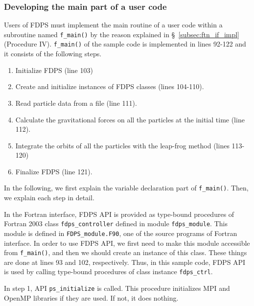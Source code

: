 \documentclass[twocolumn,useamsfonts]{pasj01}
\begin{document}
\subsubsection{Developing the main part of a user code}
Users of FDPS must implement the main routine of a user code within a subroutine named \texttt{f\_main()} by the reason explained in \S~\ref{subsec:ftn_if_impl} (Procedure IV). \texttt{f\_main()} of the sample code is implemented in lines 92-122 and it consists of the following steps.
\begin{enumerate}
\item Initialize FDPS (line 103)
\item Create and initialize instances of FDPS classes (lines 104-110).
\item Read particle data from a file (line 111).
\item Calculate the gravitational forces on all the particles at the initial time (line 112).
\item Integrate the orbits of all the particles with the leap-frog method (lines 113-120)
\item Finalize FDPS (line 121).
\end{enumerate}
In the following, we first explain the variable declaration part of \texttt{f\_main()}. Then, we explain each step in detail.

In the Fortran interface, FDPS API is provided as type-bound procedures of  Fortran 2003 class \texttt{fdps\_controller} defined in module \texttt{fdps\_module}. This module is defined in \texttt{FDPS\_module.F90}, one of the source programs of Fortran interface. In order to use FDPS API, we first need to make this module accessible from \texttt{f\_main()}, and then we should create an instance of this class. These things are done at lines 93 and 102, respectively. Thus, in this sample code, FDPS API is used by calling type-bound procedures of class instance \texttt{fdps\_ctrl}. 

In step 1, API \texttt{ps\_initialize} is called. This procedure initializes MPI and OpenMP libraries if they are used. If not, it does nothing.
\end{document}
